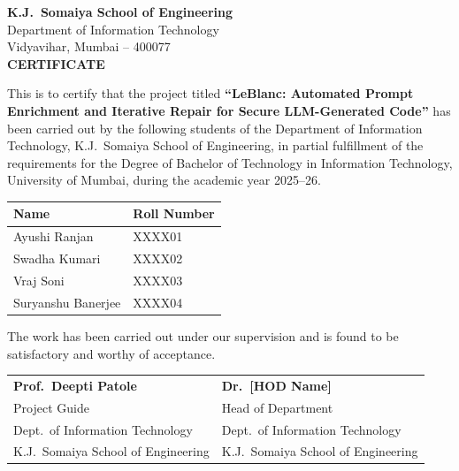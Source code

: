 \documentclass[12pt,a4paper]{report}
\begin{document}
\newpage
\thispagestyle{empty}
\begin{center}
  {\Large\bfseries K.J.\ Somaiya School of Engineering}\\[0.06in]
  {\large Department of Information Technology}\\[0.04in]
  {\normalsize Vidyavihar, Mumbai -- 400077}\\[0.3in]
  {\Large\bfseries CERTIFICATE}
\end{center}
\vspace{0.25in}
\noindent This is to certify that the project titled \textbf{``LeBlanc: Automated
Prompt Enrichment and Iterative Repair for Secure LLM-Generated Code''} has been
carried out by the following students of the Department of Information Technology,
K.J.\ Somaiya School of Engineering, in partial fulfillment of the requirements
for the Degree of Bachelor of Technology in Information Technology, University of
Mumbai, during the academic year 2025--26.

\vspace{0.2in}
\begin{center}
\begin{tabular}{ll}
\toprule
\textbf{Name} & \textbf{Roll Number} \\
\midrule
Ayushi Ranjan       & XXXX01 \\
Swadha Kumari       & XXXX02 \\
Vraj Soni           & XXXX03 \\
Suryanshu Banerjee  & XXXX04 \\
\bottomrule
\end{tabular}
\end{center}
\vspace{0.3in}
\noindent The work has been carried out under our supervision and is found to be
satisfactory and worthy of acceptance.

\vspace{0.7in}
\noindent
\begin{tabular}{@{}p{2.8in}p{2.5in}@{}}
  \textbf{Prof.\ Deepti Patole}       & \textbf{Dr.\ [HOD Name]}             \\[0.04in]
  Project Guide                       & Head of Department                   \\[0.04in]
  Dept.\ of Information Technology    & Dept.\ of Information Technology     \\[0.04in]
  K.J.\ Somaiya School of Engineering & K.J.\ Somaiya School of Engineering  \\
\end{tabular}
\end{document}
